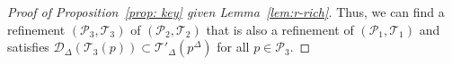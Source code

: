 \documentclass{amsart}
\newcommand{\T}{\mathcal{T}}
\newcommand{\eps}{\varepsilon}
\newcommand{\leapp}{\lessapprox}
\newcommand{\bp}{\mathbf{p}}
\newcommand{\bT}{\mathbf{T}}
\newcommand{\cD}{\mathcal{D}}
\newcommand{\cT}{\mathcal{T}}
\newcommand{\cQ}{\mathcal{Q}}
\newcommand{\cP}{\mathcal{P}}
\newcommand{\ord}{\mathrm{ord}}
\begin{document}
\begin{proof}[Proof of Proposition~\ref{prop: key} given Lemma~\ref{lem:r-rich}]
    Thus, we can find a refinement $(\cP_3, \cT_3)$ of $(\cP_2, \cT_2)$ that is also a refinement of $(\cP_1, \cT_1)$ and satisfies $ \cD_{\Delta}(\cT_3(p))\subset  \cT'_{\Delta}(p^{\Delta})$ for all $p \in \cP_3$. %



    
    

\end{proof}
\end{document}
